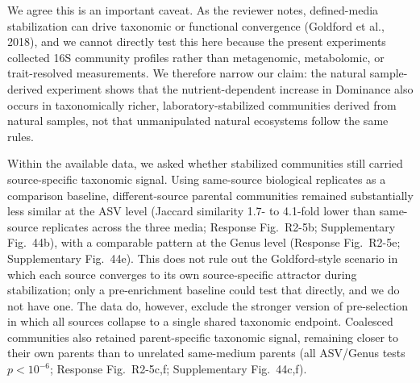
\responselabel
We agree this is an important caveat. As the reviewer notes, defined-media stabilization can drive taxonomic or functional convergence (Goldford et al., 2018), and we cannot directly test this here because the present experiments collected 16S community profiles rather than metagenomic, metabolomic, or trait-resolved measurements. We therefore narrow our claim: the natural sample-derived experiment shows that the nutrient-dependent increase in Dominance also occurs in taxonomically richer, laboratory-stabilized communities derived from natural samples, not that unmanipulated natural ecosystems follow the same rules.

Within the available data, we asked whether stabilized communities still carried source-specific taxonomic signal. Using same-source biological replicates as a comparison baseline, different-source parental communities remained substantially less similar at the ASV level (Jaccard similarity 1.7- to 4.1-fold lower than same-source replicates across the three media; Response Fig.~R2-5b; Supplementary Fig.~44b), with a comparable pattern at the Genus level (Response Fig.~R2-5e; Supplementary Fig.~44e). This does not rule out the Goldford-style scenario in which each source converges to its own source-specific attractor during stabilization; only a pre-enrichment baseline could test that directly, and we do not have one. The data do, however, exclude the stronger version of pre-selection in which all sources collapse to a single shared taxonomic endpoint. Coalesced communities also retained parent-specific taxonomic signal, remaining closer to their own parents than to unrelated same-medium parents (all ASV/Genus tests $p<10^{-6}$; Response Fig.~R2-5c,f; Supplementary Fig.~44c,f).

